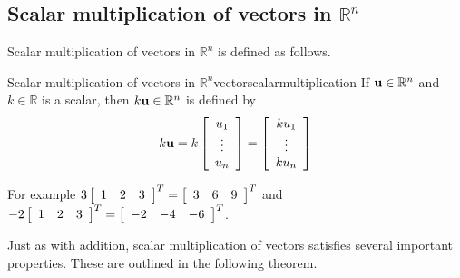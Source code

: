 \subsection{Scalar multiplication of vectors in \texorpdfstring{$\mathbb{R}^n$}{Rn}}

Scalar multiplication of vectors in $\mathbb{R}^n$ is defined as 
follows.

\begin{definition}{Scalar multiplication of vectors in $\mathbb{R}^n$}{vectorscalarmultiplication}
If ${\bf u}\in \mathbb{R}^{n}$ and $k\in \mathbb{R}$ is a
scalar, then $k{\bf u}\in \mathbb{R}^{n}$ is defined by
\begin{equation*}
k{\bf u}=k\left[ \begin{array}{c}
u_{1} \\
\vdots \\
u_{n}
\end{array}
\right] = \left[ \begin{array}{c}
ku_{1} \\
\vdots \\
ku_{n}
\end{array}
\right]
\end{equation*}
\end{definition}

For example 
$3 \left[
\begin{array}{rrr}
1 & 2 & 3
\end{array}
\right]^T =
\left[
\begin{array}{rrr}
3 & 6 & 9
\end{array}
\right]^T$
 and 
$-2\left[
\begin{array}{rrr}
1 & 2 & 3
\end{array}
\right]^T
=
\left[
\begin{array}{rrr}
-2 & -4 & -6
\end{array}
\right]^T$.

Just as with addition, scalar multiplication of vectors satisfies several important properties. These are 
outlined in the following theorem. 

